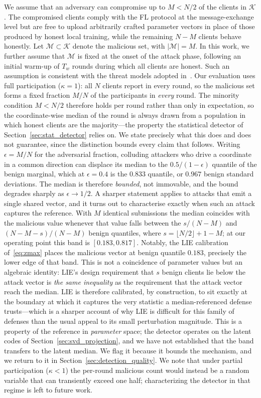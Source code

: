 \documentclass[journal]{IEEEtran}
\begin{document}
We assume that an adversary can compromise up to $M < N/2$ of the clients in $\mathcal{K}$. The compromised clients comply with the FL protocol at the message-exchange level but are free to upload arbitrarily crafted parameter vectors in place of those produced by honest local training, while the remaining $N - M$ clients behave honestly. Let $\mathcal{M} \subset \mathcal{K}$ denote the malicious set, with $|\mathcal{M}| = M$. In this work, we further assume that $\mathcal{M}$ is fixed at the onset of the attack phase, following an initial warm-up of $T_w$ rounds during which all clients are honest. Such an assumption is consistent with the threat models adopted in~\cite{baruch2019little, shejwalkar2021manipulating}. Our evaluation uses full participation ($\kappa=1$): all $N$ clients report in every round, so the malicious set forms a fixed fraction $M/N$ of the participants in \emph{every} round. The minority condition $M<N/2$ therefore holds per round rather than only in expectation, so the coordinate-wise median of the round is always drawn from a population in which honest clients are the majority---the property the statistical detector of Section~\ref{sec:stat_detector} relies on. We state precisely what this does and does not guarantee, since the distinction bounds every claim that follows. Writing $\epsilon = M/N$ for the adversarial fraction, colluding attackers who drive a coordinate in a common direction can displace its median to the $0.5/(1-\epsilon)$ quantile of the benign marginal, which at $\epsilon = 0.4$ is the $0.833$ quantile, or $0.967$ benign standard deviations. The median is therefore \emph{bounded}, not immovable, and the bound degrades sharply as $\epsilon \to 1/2$. A sharper statement applies to attacks that emit a single shared vector, and it turns out to characterise exactly when such an attack captures the reference. With $M$ identical submissions the median coincides with the malicious value whenever that value falls between the $s/(N-M)$ and $(N-M-s)/(N-M)$ benign quantiles, where $s = \lfloor N/2 \rfloor + 1 - M$; at our operating point this band is $[0.183, 0.817]$. Notably, the LIE calibration of~\eqref{eq:zmax} places the malicious vector at benign quantile $0.183$, precisely the lower edge of that band. This is not a coincidence of parameter values but an algebraic identity: LIE's design requirement that $s$ benign clients lie below the attack vector is \emph{the same inequality} as the requirement that the attack vector reach the median. LIE is therefore calibrated, by construction, to sit exactly at the boundary at which it captures the very statistic a median-referenced defense trusts---which is a sharper account of why LIE is difficult for this family of defenses than the usual appeal to its small perturbation magnitude. This is a property of the reference in \emph{parameter} space; the detector operates on the latent codes of Section~\ref{sec:svd_projection}, and we have not established that the band transfers to the latent median. We flag it because it bounds the mechanism, and we return to it in Section~\ref{sec:detection_quality}. We note that under partial participation ($\kappa<1$) the per-round malicious count would instead be a random variable that can transiently exceed one half; characterizing the detector in that regime is left to future work.
\end{document}
